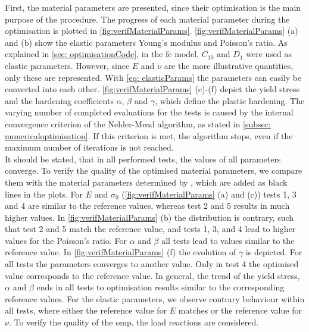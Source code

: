 First, the material parameters are presented, since their optimisation is the main purpose of the procedure. The progress of each material parameter during the optimisation is plotted in \autoref{fig:verifMaterialParams}. \autoref{fig:verifMaterialParams} (a) and (b) show the elastic parameters Young's modulus and Poisson's ratio. As explained in \autoref{sec: optimisationCode}, in the \acrshort{fe} model, $C_{10}$ and $D_1$ were used as elastic parameters. However, since $E$ and $\nu$ are the more illustrative quantities, only these are represented. With \autoref{eq: elasticParams} the parameters can easily be converted into each other.
\autoref{fig:verifMaterialParams} (c)-(f) depict the yield stress and the hardening coefficients $\alpha$, $\beta$ and $\gamma$, which define the plastic hardening.
The varying number of completed evaluations for the tests is caused by the internal convergence criterion of the Nelder-Mead algorithm, as stated in \autoref{subsec: numericaloptimisation}. If this criterion is met, the algorithm stops, even if the maximum number of iterations is not reached. \\
\indent It should be stated, that in all performed tests, the values of all parameters converge. 
To verify the quality of the optimised material parameters, we compare them with the material parameters determined by \citet{ries_deciphering_nodate}, which are added as black lines in the plots. 
For $E$ and $\sigma_0$ (\autoref{fig:verifMaterialParams} (a) and (c)) tests 1, 3 and 4 are similar to the reference values, whereas test 2 and 5 results in much higher values.
In \autoref{fig:verifMaterialParams} (b) the distribution is contrary, such that test 2 and 5 match the reference value, and tests 1, 3, and 4 lead to higher values for the Poisson's ratio.
For $\alpha$ and $\beta$ all tests lead to values similar to the reference value.
In \autoref{fig:verifMaterialParams} (f) the evolution of $\gamma$ is depicted. For all tests the parameters converges to another value. Only in test 4 the optimised value corresponds to the reference value. 
In general, the trend of the yield stress, $\alpha$ and $\beta$ ends in all tests to optimisation results similar to the corresponding reference values. For the elastic parameters, we observe contrary behaviour within all tests, where either the reference value for $E$ matches or the reference value for $\nu$. To verify the quality of the \acrlong{omp}, the load reactions are considered. 

